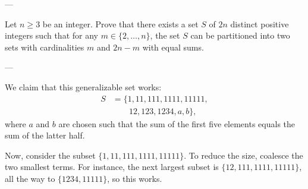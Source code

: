 
---

Let $n\ge 3$ be an integer. Prove that there exists a set $S$ of $2n$ distinct positive integers such that for any $m\in\{2,\ldots,n\}$, the set $S$ can be partitioned into two sets with cardinalities $m$ and $2n-m$ with equal sums.

---

We claim that this generalizable set works:
\begin{align*}
    S&=\{1,11,111,1111,11111,\\
    &\qquad 12,123,1234,a,b\},
\end{align*}
where $a$ and $b$ are chosen such that the sum of the first five elements equals the sum of the latter half.

Now, consider the subset $\{1,11,111,1111,11111\}$. To reduce the size, coalesce the two smallest terms. For instance, the next largest subset is $\{12,111,1111,11111\}$, all the way to $\{1234,11111\}$, so this works.
